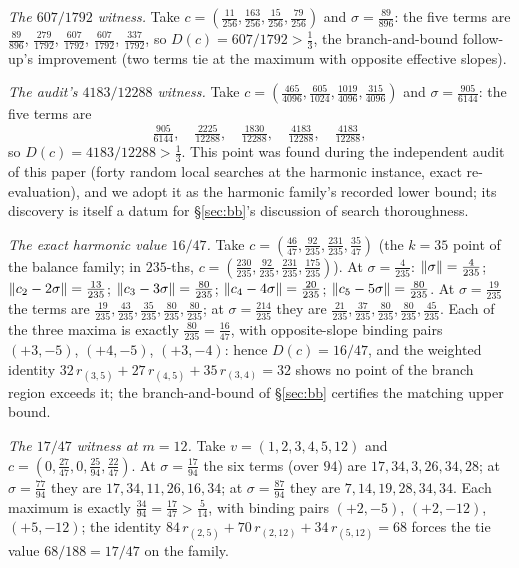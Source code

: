 \emph{The $607/1792$ witness.} Take
$c=(\tfrac{11}{256},\tfrac{163}{256},\tfrac{15}{256},
\tfrac{79}{256})$ and $\sigma=\tfrac{89}{896}$: the five terms are
$\tfrac{89}{896}$, $\tfrac{279}{1792}$, $\tfrac{607}{1792}$,
$\tfrac{607}{1792}$, $\tfrac{337}{1792}$, so $D(c)=607/1792>
\tfrac13$, the branch-and-bound follow-up's improvement (two terms tie
at the maximum with opposite effective slopes).

\emph{The audit's $4183/12288$ witness.} Take
$c=(\tfrac{465}{4096},\tfrac{605}{1024},\tfrac{1019}{4096},
\tfrac{315}{4096})$ and $\sigma=\tfrac{905}{6144}$: the five terms are
\[
\tfrac{905}{6144},\quad \tfrac{2225}{12288},\quad
\tfrac{1830}{12288},\quad \tfrac{4183}{12288},\quad
\tfrac{4183}{12288},
\]
so $D(c)=4183/12288>\tfrac13$. This point was found during the independent audit of this
paper (forty random local searches at the harmonic instance, exact
re-evaluation), and we adopt it as the harmonic family's recorded lower
bound; its discovery is itself a datum for \S\ref{sec:bb}'s discussion
of search thoroughness.

\emph{The exact harmonic value $16/47$.} Take
$c=(\tfrac{46}{47},\tfrac{92}{235},\tfrac{231}{235},\tfrac{35}{47})$
(the $k=35$ point of the balance family; in $235$-ths,
$c=(\tfrac{230}{235},\tfrac{92}{235},\tfrac{231}{235},
\tfrac{175}{235})$). At $\sigma=\tfrac4{235}$:
$\lVert \sigma \rVert=\tfrac4{235}$;
$\lVert c_2-2\sigma \rVert=\tfrac{13}{235}$;
$\lVert c_3-3\sigma \rVert=\tfrac{80}{235}$;
$\lVert c_4-4\sigma \rVert=\tfrac{20}{235}$;
$\lVert c_5-5\sigma \rVert=\tfrac{80}{235}$.
At $\sigma=\tfrac{19}{235}$ the terms are
$\tfrac{19}{235},\tfrac{43}{235},\tfrac{35}{235},
\tfrac{80}{235},\tfrac{80}{235}$; at $\sigma=\tfrac{214}{235}$ they
are $\tfrac{21}{235},\tfrac{37}{235},\tfrac{80}{235},
\tfrac{80}{235},\tfrac{45}{235}$. Each of the three maxima is exactly
$\tfrac{80}{235}=\tfrac{16}{47}$, with opposite-slope binding pairs
$(+3,-5)$, $(+4,-5)$, $(+3,-4)$: hence $D(c)=16/47$, and the weighted
identity $32\,r_{(3,5)}+27\,r_{(4,5)}+35\,r_{(3,4)}=32$ shows no
point of the branch region exceeds it; the branch-and-bound of
\S\ref{sec:bb} certifies the matching upper bound.

\emph{The $17/47$ witness at $m=12$.} Take $v=(1,2,3,4,5,12)$ and
$c=(0,\tfrac{27}{47},0,\tfrac{25}{94},\tfrac{22}{47})$. At
$\sigma=\tfrac{17}{94}$ the six terms (over $94$) are
$17,34,3,26,34,28$; at $\sigma=\tfrac{77}{94}$ they are
$17,34,11,26,16,34$; at $\sigma=\tfrac{87}{94}$ they are
$7,14,19,28,34,34$. Each maximum is exactly
$\tfrac{34}{94}=\tfrac{17}{47}>\tfrac5{14}$, with binding pairs
$(+2,-5)$, $(+2,-12)$, $(+5,-12)$; the identity
$84\,r_{(2,5)}+70\,r_{(2,12)}+34\,r_{(5,12)}=68$ forces the tie value
$68/188=17/47$ on the family.

